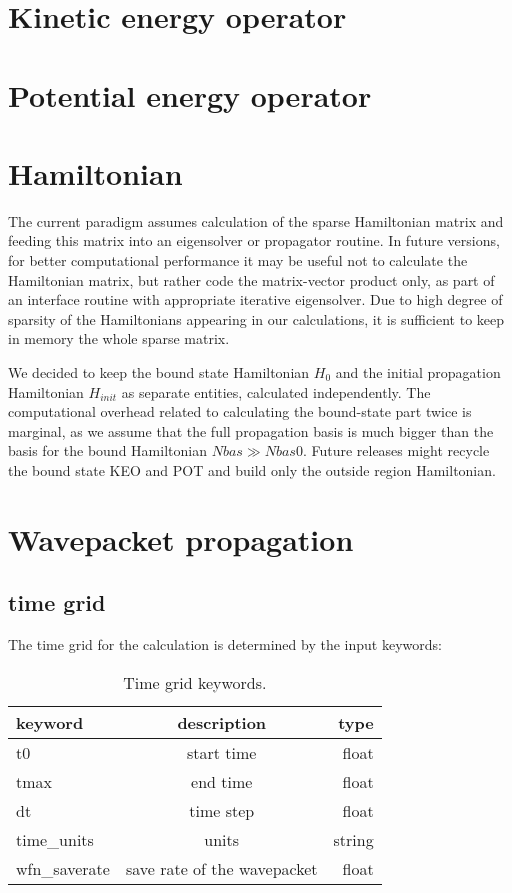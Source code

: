 \documentclass[a4paper,american,floatfix,pdftex,superscriptaddress,twoside,%
aps,pra,
linenumbers,%
reprint,%
]{revtex4-2}%
\begin{document}
\section{Kinetic energy operator}

\section{Potential energy operator}



\section{Hamiltonian}
The current paradigm assumes calculation of the sparse Hamiltonian matrix and feeding this matrix into an eigensolver or propagator routine. In future versions, for better computational performance it may be useful not to calculate the Hamiltonian matrix, but rather code the matrix-vector product only, as part of an interface routine with appropriate iterative eigensolver.
Due to high degree of sparsity of the Hamiltonians appearing in our calculations, it is sufficient to keep in memory the whole sparse matrix.

We decided to keep the bound state Hamiltonian $H_0$ and the initial propagation Hamiltonian $H_{init}$ as separate entities, calculated independently. The computational overhead related to calculating the bound-state part twice is marginal, as we assume that the full propagation basis is much bigger than the basis for the bound Hamiltonian $Nbas \gg Nbas0$. Future releases might recycle the bound state KEO and POT and build only the outside region Hamiltonian.

\section{Wavepacket propagation}
\subsection{time grid}
The time grid for the calculation is determined by the input keywords:
\begin{table}[h!]
	\begin{center}
		\caption{Time grid keywords.}
		\label{tab:time-grids}
		\begin{tabular}{l|c|r}
			\textbf{keyword} & \textbf{description} & \textbf{type}\\
			\hline
			t0 & start time & float\\
			tmax & end time & float\\
			dt & time step & float\\
			time\_units & units & string \\
			wfn\_saverate & save rate of the wavepacket  & float \\
			
		\end{tabular}
	\end{center}
\end{table}
\end{document}
